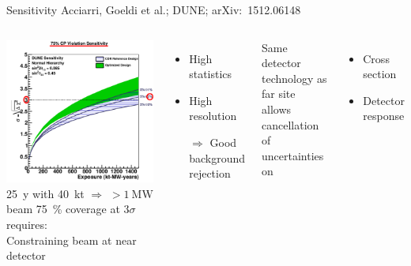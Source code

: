 \documentclass[]{beamer}
\newcommand*{\emphcol}{red}
\newcommand*{\dune}{{DUNE}}
\begin{document}
\begin{frame}{Sensitivity}{}
	{\tiny Acciarri, Goeldi et al.; \dune{}; arXiv:~1512.06148~\cite{dune2}}
	\begin{columns}[c]
		\centering
		\includegraphics[width=\textwidth]{defence/cpv75_exp_syst}\\
		\SI{25}{y} with \SI{40}{\kilo\tonne} {\color{\emphcol} $\Rightarrow$ $> \SI{1}{\mega\watt}$ beam}
		\SI{75}{\percent} coverage at $\num{3}\sigma$ requires:\\
		{\color{\emphcol} Constraining beam at near detector}
		\begin{itemize}
			\item High statistics
			\item High resolution
			\item[$\Rightarrow$] Good background rejection
		\end{itemize}
		Same detector technology as far site allows cancellation of uncertainties on
		\begin{itemize}
			\item Cross section
			\item Detector response
		\end{itemize}
	\end{columns}
\end{frame}
\end{document}
